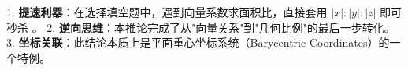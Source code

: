 \begin{summarybox}
1. \textbf{提速利器}：在选择填空题中，遇到向量系数求面积比，直接套用 $|x| : |y| : |z|$ 即可秒杀 。
2. \textbf{逆向思维}：本推论完成了从"向量关系"到"几何比例"的最后一步转化。
3. \textbf{坐标关联}：此结论本质上是平面重心坐标系统（Barycentric Coordinates）的一个特例。
\end{summarybox}